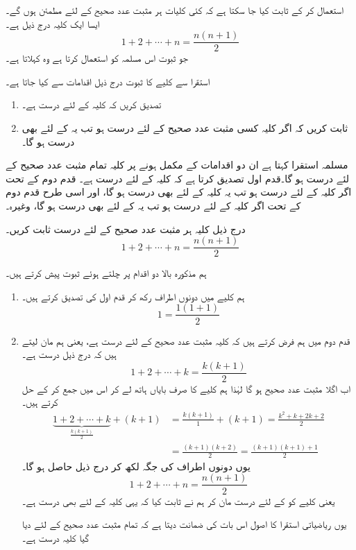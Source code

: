

 استعمال کر کے   ثابت کیا جا سکتا ہے کہ  کئی کلیات ہر مثبت عدد صحیح کے لئے مطمئن ہوں گے۔ ایسا ایک کلیہ درج ذیل ہے۔
\[1+2+\cdots+n=\frac{n(n+1)}{2}\]
جو ثبوت اس مسلمہ  کو استعمال کرتا ہے وہ  کہلاتا ہے۔

 استقرا سے کلیے کا ثبوت درج ذیل اقدامات سے کیا جاتا ہے۔
\begin{enumerate}[1.]
\item
تصدیق کریں کہ کلیہ  کے لئے درست ہے۔
\item
ثابت کریں کہ  اگر کلیہ کسی مثبت عدد صحیح   کے لئے درست ہو تب یہ  کے لئے بھی درست ہو گا۔
\end{enumerate}

مسلمہ  استقرا کہتا ہے ان دو اقدامات کے مکمل ہونے پر کلیہ تمام مثبت عدد صحیح   کے لئے درست ہو گا۔قدم  اول تصدیق کرتا ہے کہ کلیہ  کے لئے درست ہے۔  قدم    دوم کے تحت اگر کلیہ   کے لئے درست ہو تب   یہ کلیہ   کے لئے بھی درست ہو گا، اور اسی طرح قدم دوم  کے تحت اگر  کلیہ   کے لئے درست ہو تب یہ  کے لئے بھی درست ہو گا، وغیرہ۔

درج ذیل کلیہ ہر مثبت عدد صحیح  کے لئے درست ثابت کریں۔
\[1+2+\cdots+n=\frac{n(n+1)}{2}\]

ہم  مذکورہ بالا دو اقدام پر چلتے ہوئے ثبوت پیش کرتے  ہیں۔
\begin{enumerate}[1.]
\item
ہم کلیے  میں دونوں اطراف    رکھ کر قدم اول  کی تصدیق  کرتے ہیں۔
\[1=\frac{1(1+1)}{2}\]
\item
قدم دوم میں ہم فرض کرتے ہیں  کہ کلیہ  مثبت عدد صحیح  کے لئے درست ہے، یعنی ہم مان لیتے ہیں کہ درج ذیل درست ہے۔
\[1+2+\cdots+k=\frac{k(k+1)}{2}\]
اب اگلا  مثبت عدد صحیح  ہو گا لہٰذا  ہم کلیے کا صرف بایاں ہاتھ لے کر اس میں  جمع کر کے حل کرتے ہیں۔
\begin{align*}
\underbrace{1+2+\cdots+k}_{\frac{k(k+1)}{2}}+(k+1)&=\frac{k(k+1)}{1}+(k+1)=\frac{k^2+k+2k+2}{2}\\
&=\frac{(k+1)(k+2)}{2}=\frac{(k+1)(k+1)+1}{2}
\end{align*}
یوں دونوں اطراف  کی جگہ  لکھ کر درج ذیل حاصل ہو گا۔
\[1+2+\cdots+n=\frac{n(n+1)}{2}\]
یعنی کلیے کو  کے لئے درست مان کر ہم نے ثابت کیا کہ یہی کلیہ  کے لئے بھی درست ہے۔

یوں ریاضیاتی  استقرا کا اصول  اس بات کی ضمانت دیتا ہے کہ تمام مثبت عدد صحیح  کے لئے دیا گیا کلیہ درست ہے۔
\end{enumerate}

